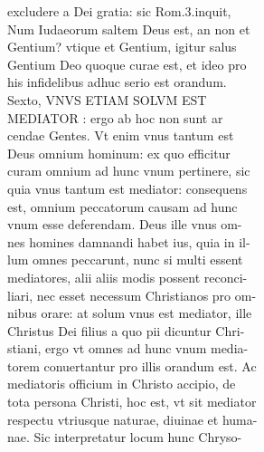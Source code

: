\documentclass{article}
\begin{document}
\begin{pages}
                excludere a Dei gratia: sic Rom.3.inquit, \\
                Num Iudaeorum saltem Deus est, an non et \\
                Gentium? vtique et Gentium, igitur salus \\
                Gentium Deo quoque curae est, et ideo pro \\
                his infidelibus adhuc serio est orandum. \\
                Sexto, VNVS ETIAM SOLVM EST \\
                MEDIATOR : ergo ab hoc non sunt ar \\
                cendae Gentes. Vt enim vnus tantum est \\
                Deus omnium hominum: ex quo efficitur \\
                curam omnium ad hunc vnum pertinere, sic \\
                quia vnus tantum est mediator: consequens \\
                est, omnium peccatorum causam ad hunc \\
                vnum esse deferendam. Deus ille vnus om- \\
                nes homines damnandi habet ius, quia in il- \\
                lum omnes peccarunt, nunc si multi essent \\
                mediatores, alii aliis modis possent reconci- \\
                liari, nec esset necessum Christianos pro om- \\
                nibus orare: at solum vnus est mediator, ille \\
                Christus Dei filius a quo pii dicuntur Chri- \\
                stiani, ergo vt omnes ad hunc vnum media- \\
                torem conuertantur pro illis orandum est. Ac \\
                mediatoris officium in Christo accipio, de \\
                tota persona Christi, hoc est, vt sit mediator \\
                respectu vtriusque naturae, diuinae et huma- \\
                nae. Sic interpretatur locum hunc Chryso- \\

\end{pages}
\end{document}
